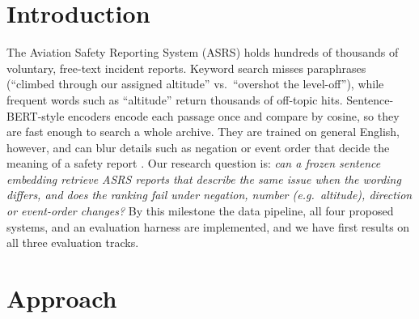 \documentclass[conference]{IEEEtran}
\begin{document}
\section{Introduction}
The Aviation Safety Reporting System (ASRS) holds hundreds of thousands of voluntary,
free-text incident reports. Keyword search misses paraphrases (``climbed through our
assigned altitude'' vs.\ ``overshot the level-off''), while frequent words such as
``altitude'' return thousands of off-topic hits. Sentence-BERT-style encoders
\cite{reimers2019sbert} encode each passage once and compare by cosine, so they are fast
enough to search a whole archive. They are trained on general English, however, and can
blur details such as negation or event order that decide the meaning of a safety report
\cite{ettinger2020bert}. Our research question is: \emph{can a frozen sentence embedding
retrieve ASRS reports that describe the same issue when the wording differs, and does the
ranking fail under negation, number (e.g.\ altitude), direction or event-order changes?} By this
milestone the data pipeline, all four proposed systems, and an evaluation harness are
implemented, and we have first results on all three evaluation tracks.

\section{Approach}
\end{document}
